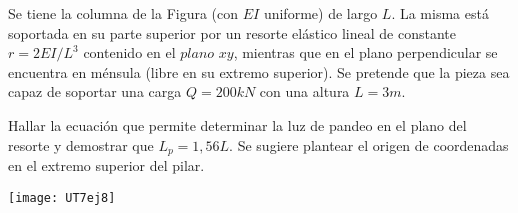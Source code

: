 \ejercicio

Se tiene la columna de la Figura (con $EI$ uniforme) de largo $L$. La misma está soportada en su parte superior por un resorte elástico lineal de constante $r=2EI/L^3$ contenido en el $plano$ $xy$, mientras que en el plano perpendicular se encuentra en ménsula (libre en su extremo superior). Se pretende que la pieza sea capaz de soportar una carga $Q=200 kN$ con una altura $L=3m$.

Hallar la ecuación que permite determinar la luz de pandeo en el plano del resorte y demostrar que $L_p=1,56L$. Se sugiere plantear el origen de coordenadas en el extremo superior del pilar.

%

\begin{center}
	\texttt{[image: UT7ej8]}
\end{center}

%
%
%
%
%

